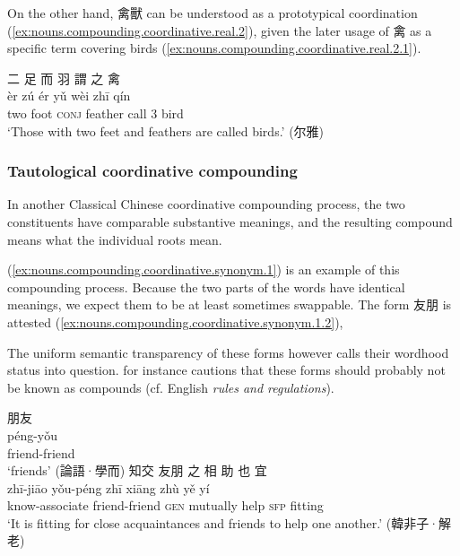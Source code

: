 \documentclass[UTF8, a4paper, oneside, scheme=plain, 12pt]{ctexrep}
\newcommand*{\citepage}[1]{p.~{#1}}
\newcommand{\form}[1]{\emph{#1}}
\newcommand{\translate}[1]{`#1'}
\newcommand*{\category}[1]{\textsc{#1}}
\begin{document}
On the other hand, 禽獸 can be understood as a prototypical coordination (\ref{ex:nouns.compounding.coordinative.real.2}),
given the later usage of 禽 as a specific term covering birds (\ref{ex:nouns.compounding.coordinative.real.2.1}).

\begin{exe}
    \ex\label{ex:nouns.compounding.coordinative.real.2.1}
    \glll 二 足 而 羽 謂 之 禽 \\
    èr zú ér yǔ wèi zhī qín \\
    two foot \category{conj} feather call 3 bird \\
    \glt\translate{Those with two feet and feathers are called birds.} \hfill (尔雅)
\end{exe}

\subsubsection{Tautological coordinative compounding}

In another Classical Chinese coordinative compounding process, 
the two constituents have comparable substantive meanings,
and the resulting compound means what the individual roots mean.

(\ref{ex:nouns.compounding.coordinative.synonym.1}) is an example of this compounding process.
Because the two parts of the words have identical meanings, 
we expect them to be at least sometimes swappable.
The form 友朋 is attested (\ref{ex:nouns.compounding.coordinative.synonym.1.2}),

The uniform semantic transparency of these forms however calls their wordhood status into question.
\citet[\citepage{11}]{unger2019grammar} for instance cautions that 
these forms should probably not be known as compounds (cf. English \form{rules and regulations}).

\begin{exe}
    \ex\label{ex:nouns.compounding.coordinative.synonym.1}
    \glll 朋友 \\
    péng-yǒu \\
    friend-friend \\
    \glt\translate{friends} \hfill (論語·學而)
    \ex\label{ex:nouns.compounding.coordinative.synonym.1.2}
    \glll 知交 友朋 之 相 助 也 宜 \\
    zhī-jiāo yǒu-péng zhī xiāng zhù yě yí \\
    know-associate friend-friend \category{gen} mutually help \category{sfp} fitting \\
    \glt\translate{It is fitting for close acquaintances and friends to help one another.} \hfill (韓非子·解老)
\end{exe}
\end{document}
